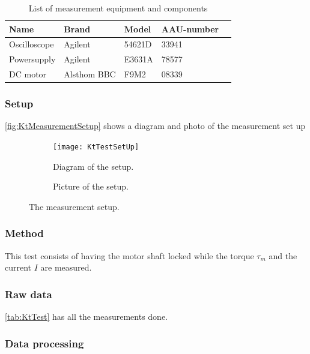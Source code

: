 \begin{table}[htbp]
	\centering
	\caption{List of measurement equipment and components}\label{tab_appendix:KtSetUp}
	
	\begin{tabularx}{\textwidth}{lXXXX}
		Name 				& Brand	& Model & AAU-number									\\ \toprule \rowcolor{lightGrey}
		Oscilloscope	& Agilent & 54621D & 33941 	\\
		Powersupply	& Agilent & E3631A & 78577\\ \rowcolor{lightGrey}
		DC motor & Alsthom BBC & F9M2& 08339
	\end{tabularx}
\end{table}

\subsubsection*{Setup}
\autoref{fig:KtMeasurementSetup} shows a diagram and photo of the measurement set up
\begin{figure}[htbp]
	\centering
	\begin{subfigure}{0.50\textwidth}
			\texttt{[image: KtTestSetUp]}
		\caption{Diagram of the setup.} \label{fig:KtMeasurementDiagram}
	\end{subfigure}
	\begin{subfigure}{0.40\textwidth}
		\caption{Picture of the setup.} \label{fig:KtMeasurementPictures}
	\end{subfigure}
	\caption{The measurement setup.} \label{fig:KtMeasurementSetup}   
\end{figure}

\subsubsection*{Method}
This test consists of having the motor shaft locked while the torque $\tau_m$ and the current $I$ are measured.

\subsubsection*{Raw data}
\autoref{tab:KtTest} has all the measurements done.


\subsubsection*{Data processing}

